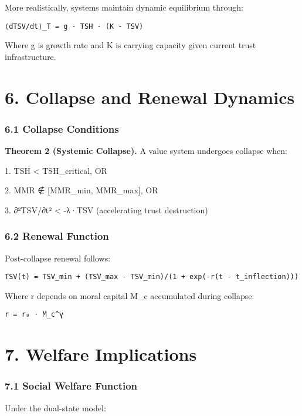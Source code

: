 \documentclass[11pt,oneside]{book}
\begin{document}
{{{{{{More realistically, systems maintain dynamic equilibrium through:

\begin{verbatim}
⟨dTSV/dt⟩_T = g · TSH · (K - TSV)
\end{verbatim}

Where g is growth rate and K is carrying capacity given current trust infrastructure.

\section{6. Collapse and Renewal Dynamics}

\subsubsection{6.1 Collapse Conditions}

\textbf{Theorem 2 (Systemic Collapse).} A value system undergoes collapse when:


1. TSH < TSH\_critical, OR


2. MMR ∉ [MMR\_min, MMR\_max], OR


3. ∂²TSV/∂t² < -λ·TSV (accelerating trust destruction)


\subsubsection{6.2 Renewal Function}

Post-collapse renewal follows:

\begin{verbatim}
TSV(t) = TSV_min + (TSV_max - TSV_min)/(1 + exp(-r(t - t_inflection)))
\end{verbatim}

Where r depends on moral capital M\_c accumulated during collapse:

\begin{verbatim}
r = r₀ · M_c^γ
\end{verbatim}

\section{7. Welfare Implications}

\subsubsection{7.1 Social Welfare Function}

Under the dual-state model:

}}}}}}
\end{document}
